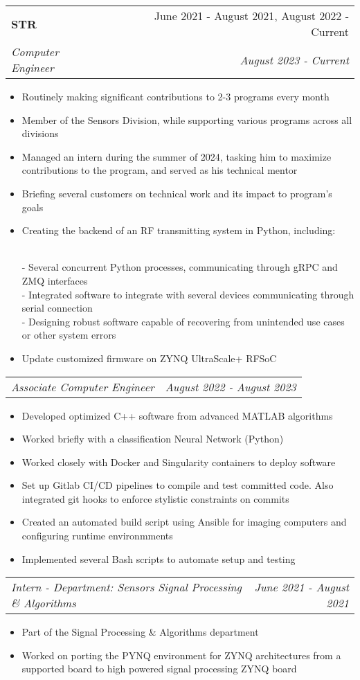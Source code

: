 \documentclass[letterpaper,11pt]{article}
\makeatletter
\newcommand{\resumeItem}[1]{
  \item\small{
    {#1 \vspace{-2pt}}
  }
}
\newcommand{\resumeSubheading}[4]{
  \vspace{-2pt}\item
    \begin{tabular*}{0.97\textwidth}[t]{l@{\extracolsep{\fill}}r}
      \textbf{#1} & #2 \\
      \textit{\small#3} & \textit{\small #4} \\
    \end{tabular*}\vspace{-7pt}
}
\newcommand{\resumeSubSubheading}[2]{
    \item
    \begin{tabular*}{0.97\textwidth}{l@{\extracolsep{\fill}}r}
      \textit{\small#1} & \textit{\small #2} \\
    \end{tabular*}\vspace{-7pt}
}
\newcommand{\resumeItemListStart}{\begin{itemize}}
\newcommand{\resumeItemListEnd}{\end{itemize}\vspace{-5pt}}
\makeatother
\begin{document}
    \resumeSubheading
      {STR}{June 2021 - August 2021, August 2022 - Current}
      {Computer Engineer}{August 2023 - Current}
        \resumeItemListStart
          \resumeItem{Routinely making significant contributions to 2-3 programs every month}
          \resumeItem{Member of the Sensors Division, while supporting various programs across all divisions}
          \resumeItem{Managed an intern during the summer of 2024, tasking him to maximize contributions to the program, and served as his technical mentor}
          \resumeItem{Briefing several customers on technical work and its impact to program's goals}
          \resumeItem{Creating the backend of an RF transmitting system in Python, including:}
            \\ {\quad - Several concurrent Python processes, communicating through gRPC and ZMQ interfaces}
            \\ {\quad - Integrated software to integrate with several devices communicating through serial connection}
            \\ {\quad - Designing robust software capable of recovering from unintended use cases or other system errors}
          \resumeItem{Update customized firmware on ZYNQ UltraScale+ RFSoC}  
        \resumeItemListEnd
      
      \resumeSubSubheading
        {Associate Computer Engineer}{August 2022 - August 2023}
        \resumeItemListStart
          \resumeItem{Developed optimized C++ software from advanced MATLAB algorithms}
          \resumeItem{Worked briefly with a classification Neural Network (Python)}
          \resumeItem{Worked closely with Docker and Singularity containers to deploy software}
          \resumeItem{Set up Gitlab CI/CD pipelines to compile and test committed code. Also integrated git hooks to enforce stylistic constraints on commits}
          \resumeItem{Created an automated build script using Ansible for imaging computers and configuring runtime environmments}
          \resumeItem{Implemented several Bash scripts to automate setup and testing}
        \resumeItemListEnd

      \resumeSubSubheading
        {Intern - Department: Sensors Signal Processing \& Algorithms}{June 2021 - August 2021}
        \resumeItemListStart
          \resumeItem{Part of the Signal Processing \& Algorithms department}
          \resumeItem{Worked on porting the PYNQ environment for ZYNQ architectures from a supported board to high powered signal processing ZYNQ board}
        \resumeItemListEnd
    
\end{document}
